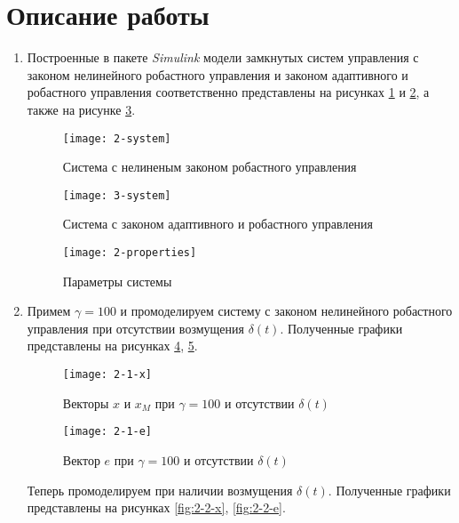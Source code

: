 \documentclass[14pt, a4paper]{extarticle}
\begin{document}
	\newpage
	
	\section*{Описание работы}
	
	\begin{enumerate}
		\item Построенные в пакете \textit{Simulink} модели замкнутых систем управления с законом нелинейного робастного управления и законом адаптивного и робастного управления соответственно представлены на рисунках \ref{fig:2-system} и \ref{fig:3-system}, а также на рисунке \ref{fig:2-properties}.
		
		\begin{figure}[H]
			\centering
			\texttt{[image: 2-system]}
			\caption{Система с нелиненым законом робастного управления}
			\label{fig:2-system}
		\end{figure}
		
		\begin{figure}[H]
			\centering
			\texttt{[image: 3-system]}
			\caption{Система с законом адаптивного и робастного управления}
			\label{fig:3-system}
		\end{figure}
	
		\begin{figure}[H]
			\centering
			\texttt{[image: 2-properties]}
			\caption{Параметры системы}
			\label{fig:2-properties}
		\end{figure}
		
		\item Примем $\gamma=100$ и промоделируем систему с законом нелинейного робастного управления при отсутствии возмущения $\delta(t)$. Полученные графики представлены на рисунках \ref{fig:2-1-x}, \ref{fig:2-1-e}.
		
		\begin{figure}[H]
			\centering
			\texttt{[image: 2-1-x]}
			\caption{Векторы $x$ и $x_M$ при $\gamma=100$ и отсутствии $\delta(t)$}
			\label{fig:2-1-x}
		\end{figure}
		
		\begin{figure}[H]
			\centering
			\texttt{[image: 2-1-e]}
			\caption{Вектор $e$ при $\gamma=100$ и отсутствии $\delta(t)$}
			\label{fig:2-1-e}
		\end{figure}
		
		Теперь промоделируем при наличии возмущения $\delta(t)$. Полученные графики представлены на рисунках \ref{fig:2-2-x}, \ref{fig:2-2-e}.
		

\end{enumerate}
\end{document}
